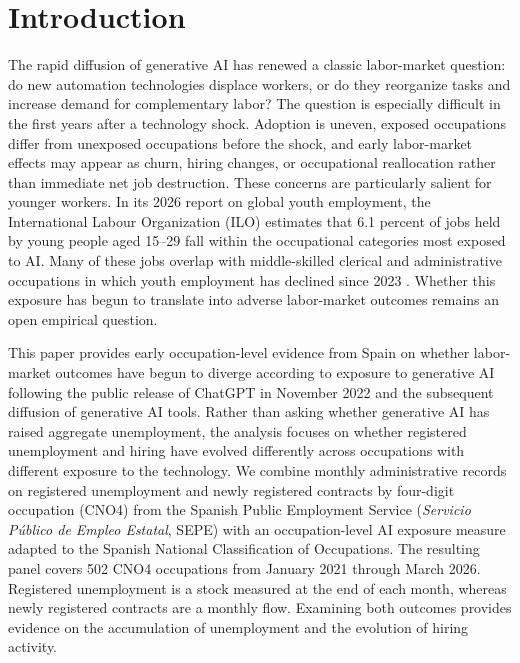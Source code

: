 \section{Introduction}
\label{sec:introduction}

The rapid diffusion of generative AI has renewed a classic labor-market question: do new automation technologies displace workers, or do they reorganize tasks and increase demand for complementary labor? The question is especially difficult in the first years after a technology shock. Adoption is uneven, exposed occupations differ from unexposed occupations before the shock, and early labor-market effects may appear as churn, hiring changes, or occupational reallocation rather than immediate net job destruction. These concerns are particularly salient for younger workers. In its 2026 report on global youth employment, the International Labour Organization (ILO) estimates that 6.1 percent of jobs held by young people aged 15--29 fall within the occupational categories most exposed to AI. Many of these jobs overlap with middle-skilled clerical and administrative occupations in which youth employment has declined since 2023 \citep{ilo_youth_2026}. Whether this exposure has begun to translate into adverse labor-market outcomes remains an open empirical question.

This paper provides early occupation-level evidence from Spain on whether labor-market outcomes have begun to diverge according to exposure to generative AI following the public release of ChatGPT in November 2022 and the subsequent diffusion of generative AI tools. Rather than asking whether generative AI has raised aggregate unemployment, the analysis focuses on whether registered unemployment and hiring have evolved differently across occupations with different exposure to the technology. We combine monthly administrative records on registered unemployment and newly registered contracts by four-digit occupation (CNO4) from the Spanish Public Employment Service (\textit{Servicio P\'ublico de Empleo Estatal}, SEPE) with an occupation-level AI exposure measure adapted to the Spanish National Classification of Occupations. The resulting panel covers 502 CNO4 occupations from January 2021 through March 2026. Registered unemployment is a stock measured at the end of each month, whereas newly registered contracts are a monthly flow. Examining both outcomes provides evidence on the accumulation of unemployment and the evolution of hiring activity.

